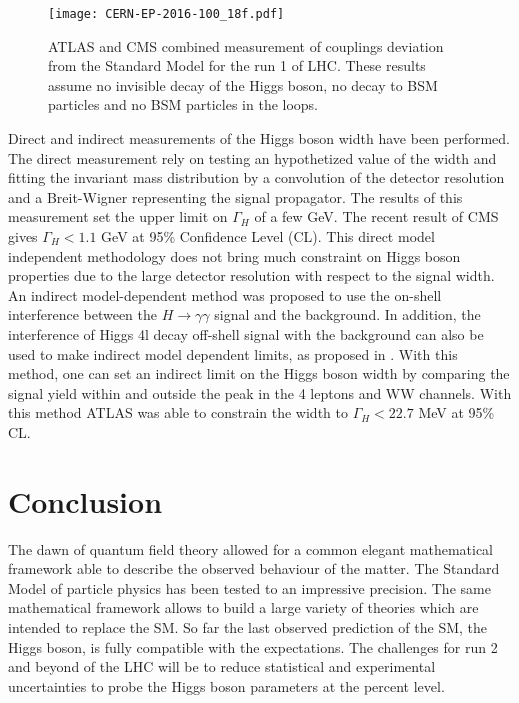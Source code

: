 \begin{figure}[htbp]
\centering
\texttt{[image: CERN-EP-2016-100\_18f.pdf]}
\caption{\label{fig:orgfd66e48}
ATLAS and CMS combined measurement of couplings deviation from the Standard Model for the run 1 of LHC. These results assume no invisible decay of the Higgs boson, no decay to BSM particles and no BSM particles in the loops. \cite{CERN-EP-2016-100}}
\end{figure}

Direct and indirect measurements of the Higgs boson width have been performed.
The direct measurement rely on testing an hypothetized value of the width and fitting the invariant mass distribution by a convolution of the detector resolution and a Breit-Wigner representing the signal propagator.
The results of this measurement \cite{CERN-THESIS-2015-193,CERN-PH-EP-2014-122} set the upper limit on $\Gamma_H$ of a few GeV.
The recent result of CMS \cite{CMS-PAS-HIG-16-041,CMS-HIG-16-041} gives $\Gamma_H < 1.1$ GeV at 95\% Confidence Level (CL).
This direct model independent methodology does not bring much constraint on Higgs boson properties due to the large detector resolution with respect to the signal width.
An indirect model-dependent method was proposed \cite{Dixon:2013haa} to use the on-shell interference between the \(H\rightarrow\gamma\gamma\) signal and the background.
In addition, the interference of Higgs 4l decay off-shell signal with the background can also be used to make indirect model dependent limits, as proposed in \cite{Caola:2013yja}.
With this method, one can set an indirect limit on the Higgs boson width by comparing the signal yield within and outside the peak in the 4 leptons and WW channels.
With this method ATLAS \cite{ATLAS-CONF-2014-042,CERN-PH-EP-2015-026} was able to constrain the width to $\Gamma_H <22.7$ MeV at 95\% CL.




\section{Conclusion}
\label{sec:org69deba1}
The dawn of quantum field theory allowed for a common elegant mathematical framework able to describe the observed behaviour of the matter.
The Standard Model of particle physics has been tested to an impressive precision.
The same mathematical framework allows to build a large variety of theories which are intended to replace the SM.
So far the last observed prediction of the SM, the Higgs boson, is fully compatible with the expectations.
The challenges for run 2 and beyond of the LHC will be to reduce statistical and experimental uncertainties to probe the Higgs boson parameters at the percent level.
